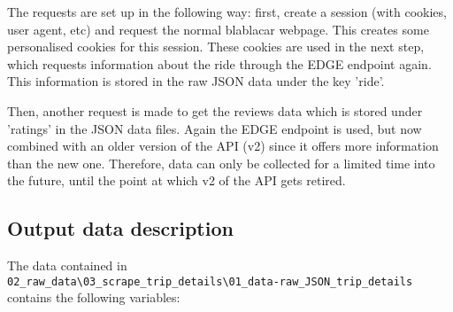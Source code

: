 \documentclass[11pt,a4paper]{article}
\begin{document}
The requests are set up in the following way:
first, create a session (with cookies, user agent, etc) and request the normal blablacar webpage.
This creates some personalised cookies for this session.
These cookies are used in the next step, which requests information about the ride through the EDGE endpoint again.
This information is stored in the raw JSON data under the key 'ride'.

Then, another request is made to get the reviews data which is stored under 'ratings' in the JSON data files.
Again the EDGE endpoint is used, but now combined with an older version of the API (v2) since it offers more information than the new one.
Therefore, data can only be collected for a limited time into the future, until the point at which v2 of the API gets retired.



\clearpage 
\subsection{Output data description}
The data contained in \\\verb|02_raw_data\03_scrape_trip_details\01_data-raw_JSON_trip_details| contains the following variables:
\end{document}
